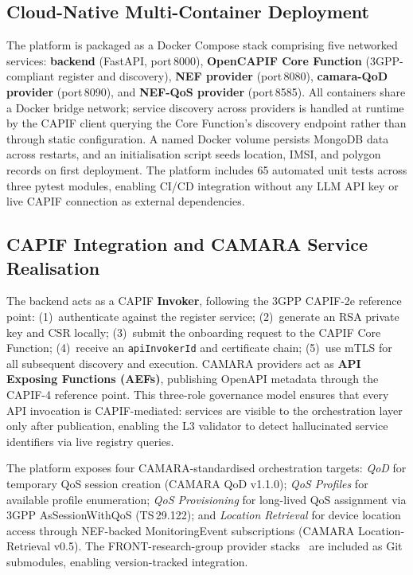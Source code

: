\documentclass[conference]{IEEEtran}
\begin{document}

\subsection{Cloud-Native Multi-Container Deployment}

The platform is packaged as a Docker Compose stack comprising five
networked services: \textbf{backend} (FastAPI, port\,8000),
\textbf{OpenCAPIF Core Function} (3GPP-compliant register and discovery),
\textbf{NEF provider} (port\,8080), \textbf{camara-QoD provider}
(port\,8090), and \textbf{NEF-QoS provider} (port\,8585).
All containers share a Docker bridge network; service discovery across
providers is handled at runtime by the CAPIF client querying the Core
Function's discovery endpoint rather than through static configuration.
A named Docker volume persists MongoDB data across restarts, and an
initialisation script seeds location, IMSI, and polygon records on
first deployment.
The platform includes 65 automated unit tests across three pytest modules,
enabling CI/CD integration without any LLM API key or live CAPIF
connection as external dependencies.

\subsection{CAPIF Integration and CAMARA Service Realisation}

The backend acts as a CAPIF \textbf{Invoker}, following the 3GPP CAPIF-2e
reference point: (1)~authenticate against the register service;
(2)~generate an RSA private key and CSR locally;
(3)~submit the onboarding request to the CAPIF Core Function;
(4)~receive an \texttt{apiInvokerId} and certificate chain;
(5)~use mTLS for all subsequent discovery and execution.
CAMARA providers act as \textbf{API Exposing Functions (AEFs)},
publishing OpenAPI metadata through the CAPIF-4 reference point.
This three-role governance model ensures that every API invocation is
CAPIF-mediated: services are visible to the orchestration layer only
after publication, enabling the L3 validator to detect hallucinated
service identifiers via live registry queries.

The platform exposes four CAMARA-standardised orchestration targets:
\textit{QoD} for temporary QoS session creation (CAMARA QoD v1.1.0);
\textit{QoS Profiles} for available profile enumeration;
\textit{QoS Provisioning} for long-lived QoS assignment via 3GPP
AsSessionWithQoS (TS\,29.122); and \textit{Location Retrieval}
for device location access through NEF-backed MonitoringEvent
subscriptions (CAMARA Location-Retrieval v0.5).
The FRONT-research-group provider stacks~\cite{turkovic2025} are
included as Git submodules, enabling version-tracked integration.
\end{document}
